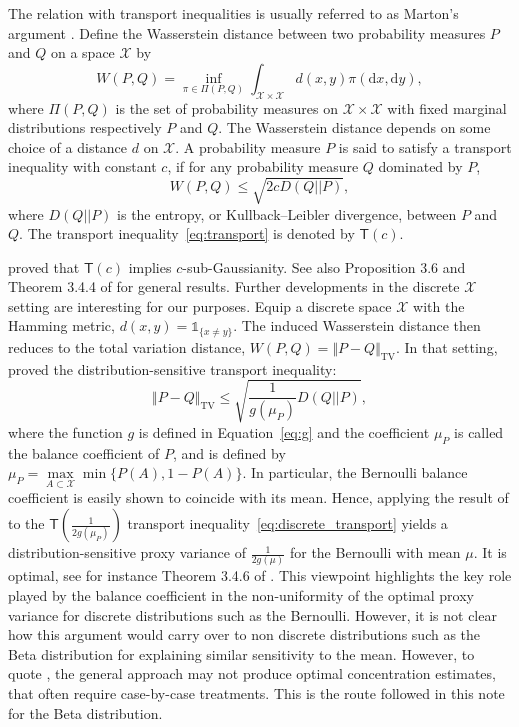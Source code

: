 \documentclass[15pt]{article}
\newcommand{\ddr}{\mathrm{d}}
\theoremstyle{plain}
\begin{document}
The relation with transport inequalities is usually referred to as Marton's argument \citep[see for instance][Section 3.4]{raginsky2013concentration}. 
Define the Wasserstein distance between two probability measures $P$ and $Q$ on a space $\mathcal{X}$ by 
\begin{equation*}
W(P,Q) = \inf_{\pi\in\Pi(P,Q)}\int_{\mathcal{X}\times \mathcal{X}}d(x,y)\pi(\ddr x, \ddr y),
\end{equation*}
where $\Pi(P,Q)$ is the set of probability measures on $\mathcal{X}\times \mathcal{X}$ with fixed marginal distributions respectively $P$ and $Q$. The  Wasserstein distance  depends on some choice of a distance $d$ on $\mathcal{X}$. A probability measure $P$ is said to satisfy a transport inequality with constant $c$, if for any probability measure $Q$ dominated by $P$,
\begin{equation}\label{eq:transport}
W(P,Q) \leq \sqrt{2c D(Q||P)},
\end{equation}
where $D(Q||P)$ is the entropy, or Kullback--Leibler divergence, between $P$ and $Q$. The transport inequality~\eqref{eq:transport} is denoted by $\mathsf{T}(c)$. 

\cite{bobkov1999exponential} proved that $\mathsf{T}(c)$ implies $c$-sub-Gaussianity. See also Proposition 3.6 and Theorem 3.4.4 of \cite{raginsky2013concentration} for general results. 
Further developments in the discrete $\mathcal{X}$ setting are interesting for our purposes. Equip a discrete space $\mathcal{X}$ with the Hamming metric, $d(x,y) = \mathbb{1}_{\{x\neq y\}}$. The induced Wasserstein distance then reduces to the total variation distance, $W(P,Q) = \Vert P-Q\Vert_{\text{TV}}$. In that setting, \cite{ordentlich2005distribution} proved the distribution-sensitive transport inequality:
\begin{equation}\label{eq:discrete_transport}
\Vert P-Q\Vert_{\text{TV}} \leq \sqrt{\frac{1}{g(\mu_P)}D(Q||P)},
\end{equation}
where the function $g$ is defined in Equation~\eqref{eq:g} and the coefficient $\mu_P$ is called the balance coefficient of $P$, and is defined by $\mu_P = \underset{A\subset \mathcal{X}}\max\min \{P(A), 1-P(A)\}$. In particular, the Bernoulli balance coefficient is easily shown to coincide with its mean. Hence, applying the result  of \cite{bobkov1999exponential} to the $\mathsf{T}\left(\frac{1}{2g(\mu_P)}\right)$ transport inequality~\eqref{eq:discrete_transport} yields a distribution-sensitive proxy variance of $\frac{1}{2g(\mu)}$ for the Bernoulli with mean $\mu$. It is optimal, see for instance Theorem 3.4.6 of \cite{raginsky2013concentration}.  This viewpoint highlights the key role played by the balance coefficient in the non-uniformity of the optimal proxy variance for discrete distributions such as the Bernoulli. However, it is not clear how this argument would carry over to non discrete distributions such as the Beta distribution for explaining similar sensitivity to the mean. However, to quote \cite{raginsky2013concentration}, the general approach may not produce optimal concentration estimates, that often require case-by-case treatments. This is the route followed in this note for the Beta distribution.%
\end{document}
